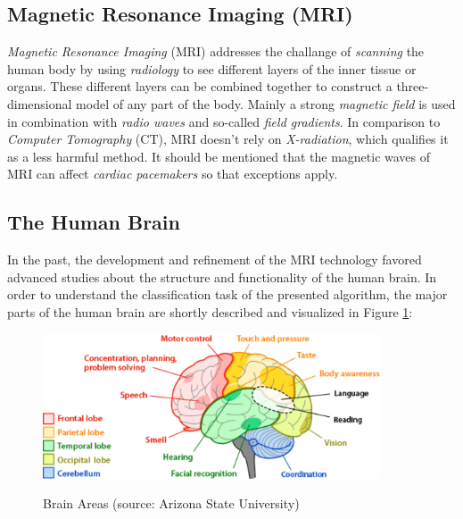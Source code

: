\documentclass[twoside,11pt]{article}
\begin{document}
\subsection{Magnetic Resonance Imaging (MRI)}
\textit{Magnetic Resonance Imaging} (MRI) addresses the challange of 
\textit{scanning} the human body by using \textit{radiology}  to see different layers of the inner tissue or organs. These different layers can be combined together to construct a three-dimensional model of any part of the body. Mainly a strong  \textit{magnetic field} is used in combination with \textit{radio waves}  and so-called \textit{field gradients}.
In comparison to \textit{Computer Tomography} (CT), MRI doesn't rely on \textit{X-radiation}, which qualifies it as a less harmful method. It should be mentioned that the magnetic waves of MRI can affect \textit{cardiac pacemakers} so that exceptions apply. \citep{edelman1993magnetic}

\subsection{The Human Brain}
\label{brain}
In the past, the development and refinement of the MRI technology favored advanced studies about the structure and functionality of the human brain. In order to understand the classification task of the presented algorithm, the major parts of the human brain are shortly described and visualized in Figure \ref{fig:brain}:
\begin{figure}
	\centering
	\includegraphics[width=10cm]{brain-areas}
	\label{fig:brain}
	\caption{Brain Areas (source: Arizona State University)}
\end{figure}%
\end{document}
